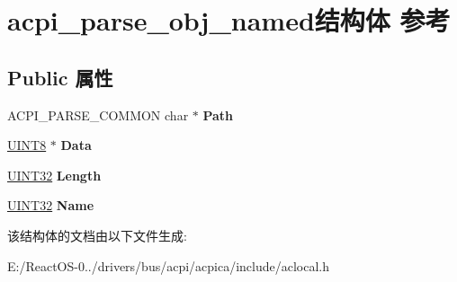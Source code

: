 \hypertarget{structacpi__parse__obj__named}{}\section{acpi\+\_\+parse\+\_\+obj\+\_\+named结构体 参考}
\label{structacpi__parse__obj__named}
\subsection*{Public 属性}
\begin{DoxyCompactItemize}
\item 
\mbox{\label{structacpi__parse__obj__named_a6b2974edcfff4f7d75581a52053690e2}} 
A\+C\+P\+I\+\_\+\+P\+A\+R\+S\+E\+\_\+\+C\+O\+M\+M\+ON char $\ast$ {\bfseries Path}
\item 
\mbox{\label{structacpi__parse__obj__named_ac600bac3e56bb009c182f3c26a658838}} 
\hyperlink{_processor_bind_8h_ab27e9918b538ce9d8ca692479b375b6a}{U\+I\+N\+T8} $\ast$ {\bfseries Data}
\item 
\mbox{\label{structacpi__parse__obj__named_a5f8a7fcc47d6abd4c365df07cda7153f}} 
\hyperlink{_processor_bind_8h_ae1e6edbbc26d6fbc71a90190d0266018}{U\+I\+N\+T32} {\bfseries Length}
\item 
\mbox{\label{structacpi__parse__obj__named_ac8acadfc861697fbc1a84186f2424975}} 
\hyperlink{_processor_bind_8h_ae1e6edbbc26d6fbc71a90190d0266018}{U\+I\+N\+T32} {\bfseries Name}
\end{DoxyCompactItemize}


该结构体的文档由以下文件生成\+:\begin{DoxyCompactItemize}
\item 
E\+:/\+React\+O\+S-\/0../drivers/bus/acpi/acpica/include/aclocal.\+h\end{DoxyCompactItemize}
